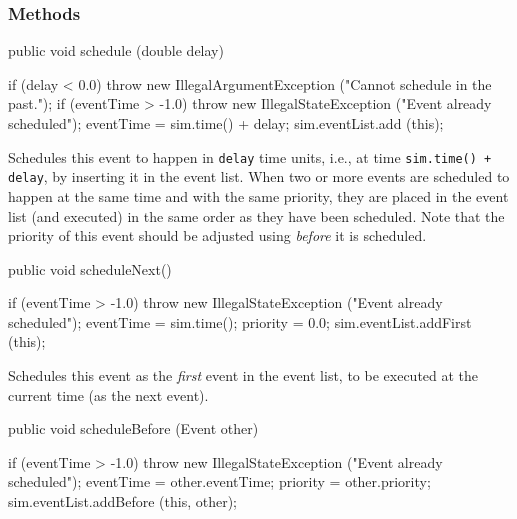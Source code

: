 \subsubsection* {Methods}

\begin{code}

   public void schedule (double delay) \begin{hide} {
      if (delay < 0.0)
         throw new IllegalArgumentException ("Cannot schedule in the past.");
      if (eventTime > -1.0)
         throw new IllegalStateException ("Event already scheduled");
      eventTime = sim.time() + delay;
      sim.eventList.add (this);
   } \end{hide}
\end{code}
  \begin{tabb} Schedules this event to happen in \texttt{delay} time units,
   i.e., at time \texttt{sim.time() + delay}, by inserting it in the event list.
   When two or more events are scheduled to happen at the same time and
    with the same priority,
   they are placed in the event list (and executed) in the same order
   as they have been scheduled.
   Note that the priority of this event should be adjusted using
    \emph{before} it is scheduled.
  \end{tabb}
\begin{htmlonly}
\end{htmlonly}
\begin{code}

   public void scheduleNext() \begin{hide} {
      if (eventTime > -1.0)
         throw new IllegalStateException ("Event already scheduled");
      eventTime = sim.time();
      priority  = 0.0;
      sim.eventList.addFirst (this);
   } \end{hide}
\end{code}
  \begin{tabb}  Schedules this event as the {\em first\/} event in the event
   list, to be executed at the current time (as the next event).
  \end{tabb}
\begin{code}

   public void scheduleBefore (Event other) \begin{hide} {
      if (eventTime > -1.0)
         throw new IllegalStateException ("Event already scheduled");
      eventTime = other.eventTime;
      priority = other.priority;
      sim.eventList.addBefore (this, other);
   } \end{hide}
\end{code}
